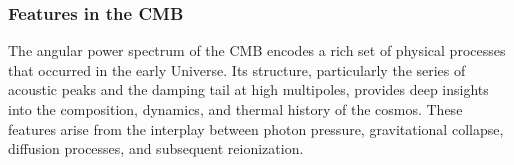 \documentclass{aa}
\numberwithin{equation}{section}
\numberwithin{table}{section}
\numberwithin{figure}{section}
\begin{document}


\subsubsection{Features in the CMB}\label{subsubsec: IV theory features}
The angular power spectrum of the CMB encodes a rich set of physical processes that occurred in the early Universe. Its structure, particularly the series of acoustic peaks and the damping tail at high multipoles, provides deep insights into the composition, dynamics, and thermal history of the cosmos. These features arise from the interplay between photon pressure, gravitational collapse, diffusion processes, and subsequent reionization.
\end{document}
